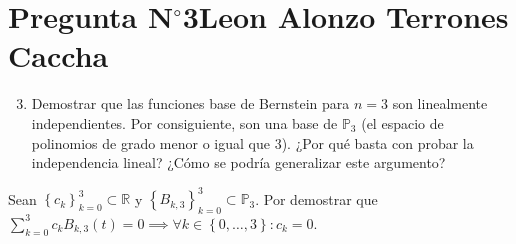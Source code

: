 \section{Pregunta N$^{\circ}$3\qquad Leon Alonzo Terrones Caccha}

\begin{frame}
    \begin{enumerate}\setcounter{enumi}{2}
        \item
              Demostrar que las funciones base de Bernstein para
              $n=3$ son linealmente independientes.
              Por consiguiente, son una base de $\mathbb{P}_{3}$
              (\alert{el espacio de polinomios de grado menor o igual
                  que $3$}).
              ¿Por qué basta con probar la independencia lineal?
              ¿Cómo se podría generalizar este argumento?
    \end{enumerate}

    \begin{solution}
        Sean
        \begin{math}
            {\left\{c_{k}\right\}}^{3}_{k=0}\subset\mathbb{R}
        \end{math}
        y
        \begin{math}
            {\left\{B_{k,3}\right\}}^{3}_{k=0}\subset\mathbb{P}_{3}
        \end{math}.
        Por demostrar que
        \begin{math}
            \sum\limits_{k=0}^{3}
            c_{k}
            B_{k,3}\left(t\right)=
            0\implies
            \forall k\in\left\{0,\dotsc,3\right\}:
            c_{k}=0
        \end{math}.


\end{solution}
\end{frame}
